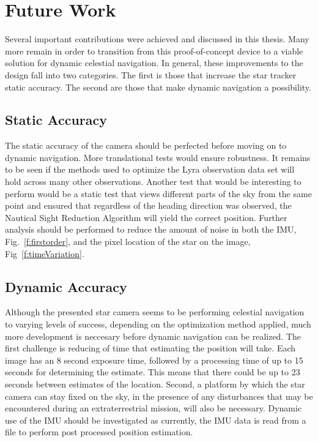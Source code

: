 \documentclass[12pt,a4paper]{book}
\begin{document}
\section{Future Work}
Several important contributions were achieved and discussed in this thesis.  Many more remain in order to transition from this proof-of-concept device to a viable solution for dynamic celestial navigation. In general, these improvements to the design fall into two categories.  The first is those that increase the star tracker static accuracy.  The second are those that make dynamic navigation a possibility. 
\subsection*{Static Accuracy}
The static accuracy of the camera should be perfected before moving on to dynamic navigation. More translational tests would ensure robustness.  It remains to be seen if the methods used to optimize the Lyra observation data set will hold across many other observations.  Another test that would be interesting to perform would be a static test that views different parts of the sky from the same point and ensured that regardless of the heading direction was observed, the Nautical Sight Reduction Algorithm will yield the correct position.  Further analysis should be performed to reduce the amount of noise in both the IMU, Fig.~\ref{f:firstorder}, and the pixel location of the star on the image, Fig~\ref{f:timeVariation}.  

\subsection*{Dynamic Accuracy}
Although the presented star camera seems to be performing celestial navigation to varying levels of success, depending on the optimization method applied, much more development is neccesary before dynamic navigation can be realized.  The first challenge is reducing of time that estimating the position will take.  Each image has an 8 second exposure time, followed by a processing time of up to 15 seconds for determining the estimate.  This means that there could be up to 23 seconds between estimates of the location. Second, a platform by which the star camera can stay fixed on the sky, in the presence of any disturbances that may be encountered during an extraterrestrial mission, will also be necessary. Dynamic use of the IMU should be investigated as currently, the IMU data is read from a file to perform post processed position estimation.
\end{document}
